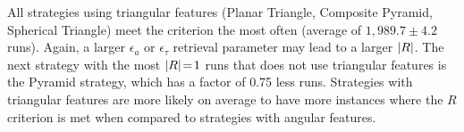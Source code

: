 All strategies using triangular features (Planar Triangle, Composite Pyramid, Spherical Triangle) meet the criterion the most often (average of $1{,}989.7 \pm 4.2$ runs).
Again, a larger $\epsilon_a$ or $\epsilon_\tau$ retrieval parameter may lead to a larger $\left| R \right|$.
The next strategy with the most $\left| R \right| \!=\! 1$ runs that does not use triangular features is the Pyramid strategy, which has a factor of 0.75 less runs.
Strategies with triangular features are more likely on average to have more instances where the $R$ criterion is met when compared to strategies with angular features.

